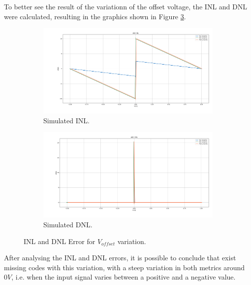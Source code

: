 To better see the result of the variationn of the offset voltage, the INL and DNL were calculated, resulting in the graphics shown in Figure \ref{fig:NL_Voffset}.


\begin{figure}[H]
    \centering
    \begin{subfigure}[b]{0.8\textwidth}
        \centering
        \includegraphics[width=\textwidth]{Images/INL_Voffset.png}
        \caption{Simulated INL.}
        \label{fig:INL_Voffset}
    \end{subfigure}%
    
    \begin{subfigure}[b]{0.8\textwidth}
        \centering
        \includegraphics[width=\textwidth]{Images/DNL_Voffset.png}
        \caption{Simulated DNL.}
        \label{fig:DNL_Voffset}
    \end{subfigure}
    \caption{INL and DNL Error for $V_{offset}$ variation.}
    \label{fig:NL_Voffset}
\end{figure}

After analysing the INL and DNL errors, it is possible to conclude that exist missing codes with this variation, with a steep variation in both metrics around $0V$, i.e. when the input signal varies between a positive and a negative value.

